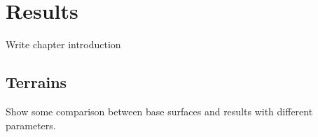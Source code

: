 \chapter{Results} \label{chap:results}

  \newcommand\plotwidth{0.95\textwidth}
  \newcommand\imagewidth{0.40\textwidth}
  	
  \begin{notes}
    \item Write chapter introduction	
  \end{notes}

  \section{Terrains} %
  
    \begin{notes}
      \item Show some comparison between base surfaces and results with different parameters.
    \end{notes}
  
